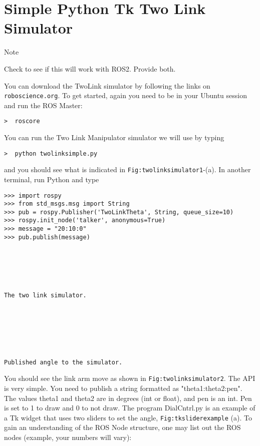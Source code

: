 \hypertarget{simple-python-tk-two-link-simulator}{%
\section{Simple Python Tk Two Link
Simulator}\label{simple-python-tk-two-link-simulator}}

Note

Check to see if this will work with ROS2. Provide both.

You can download the TwoLink simulator by following the links on
\texttt{roboscience.org}. To get started, again you need to be in your
Ubuntu session and run the ROS Master:

\begin{verbatim}
>  roscore
\end{verbatim}

You can run the Two Link Manipulator simulator we will use by typing

\begin{verbatim}
>  python twolinksimple.py
\end{verbatim}

and you should see what is indicated in
\texttt{Fig:twolinksimulator1}-(a). In another terminal, run Python and
type

\begin{verbatim}
>>> import rospy
>>> from std_msgs.msg import String
>>> pub = rospy.Publisher('TwoLinkTheta', String, queue_size=10)
>>> rospy.init_node('talker', anonymous=True)
>>> message = "20:10:0"
>>> pub.publish(message)






The two link simulator.







Published angle to the simulator.
\end{verbatim}

You should see the link arm move as shown in
\texttt{Fig:twolinksimulator2}. The API is very simple. You need to
publish a string formatted as "theta1:theta2:pen". The values theta1 and
theta2 are in degrees (int or float), and pen is an int. Pen is set to 1
to draw and 0 to not draw. The program DialCntrl.py is an example of a
Tk widget that uses two sliders to set the angle,
\texttt{Fig:tksliderexample} (a). To gain an understanding of the ROS
Node structure, one may list out the ROS nodes (example, your numbers
will vary):

